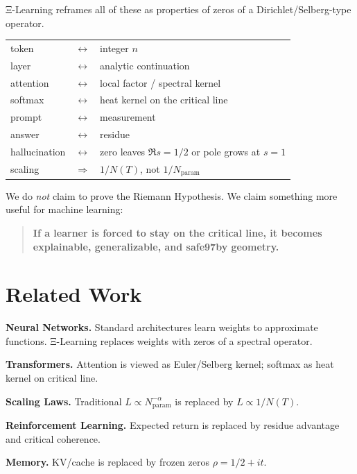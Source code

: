 \documentclass[11pt]{article}
\begin{document}
Ξ-Learning reframes all of these as properties of zeros of a Dirichlet/Selberg-type operator.

\begin{center}
\begin{tabular}{lcl}
token & $\leftrightarrow$ & integer $n$ \\
layer & $\leftrightarrow$ & analytic continuation \\
attention & $\leftrightarrow$ & local factor / spectral kernel \\
softmax & $\leftrightarrow$ & heat kernel on the critical line \\
prompt & $\leftrightarrow$ & measurement \\
answer & $\leftrightarrow$ & residue \\
hallucination & $\leftrightarrow$ & zero leaves $\Re s=1/2$ or pole grows at $s=1$ \\
scaling & $\Rightarrow$ & $1/N(T)$, not $1/N_{\text{param}}$
\end{tabular}
\end{center}

We do \emph{not} claim to prove the Riemann Hypothesis. We claim something more useful for machine learning:

\begin{quote}
\textbf{If a learner is forced to stay on the critical line, it becomes explainable, generalizable, and safe\x97by geometry.}
\end{quote}

\section{Related Work}

\textbf{Neural Networks.} Standard architectures learn weights to approximate functions. Ξ-Learning replaces weights with zeros of a spectral operator.

\textbf{Transformers.} Attention is viewed as Euler/Selberg kernel; softmax as heat kernel on critical line.

\textbf{Scaling Laws.} Traditional $L\propto N_{\text{param}}^{-\alpha}$ is replaced by $L\propto 1/N(T)$.

\textbf{Reinforcement Learning.} Expected return is replaced by residue advantage and critical coherence.

\textbf{Memory.} KV/cache is replaced by frozen zeros $\rho=1/2+it$.
\end{document}
